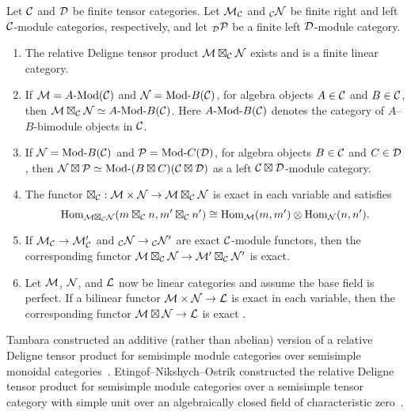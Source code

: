 \documentclass{amsart}
\begin{document}
\begin{theorem} \label{thm:DelignePrdtOverATCExists}
	Let $\mathcal C$ and $\mathcal D$ be finite tensor categories.  Let $\mathcal M_{\mathcal C}$ and ${}_{\mathcal C}\mathcal N$ be finite right and left $\mathcal C$-module categories, respectively, and let ${}_{\mathcal D}\mathcal P$ be a finite left $\mathcal D$-module category. 
	\begin{enumerate}
		\item The relative Deligne tensor product $\mathcal M \boxtimes_{\mathcal C} \mathcal N$ exists and is a finite linear category.
		\item If $\cM = \Mod{A}{}(\cC)$ and $\cN = \Mod{}{B}(\cC)$, for algebra objects $A \in \mathcal C$ and $B \in \mathcal C$, then $\cM \boxtimes_{\cC} \cN \simeq \Mod{A }{B}(\cC)$. Here $\Mod{A}{B}(\cC)$ denotes the category of $A$--$B$-bimodule objects in $\mathcal C$.
		\item If $\cN = \Mod{}{B}(\cC)$ and $\cP = \Mod{}{C}(\cD)$, for algebra objects $B \in \mathcal C$ and $C \in \mathcal D$, then $\cN \boxtimes \cP \simeq \Mod{}{(B \boxtimes C)}(\cC \boxtimes \cD)$ as a left $\mathcal C \boxtimes \mathcal D$-module category.
		\item The functor $\boxtimes_{\mathcal C}: \mathcal M \times \mathcal N \rightarrow \mathcal M \boxtimes_\mathcal C \mathcal N$ is exact in each variable and satisfies 
		\begin{equation*}
			\operatorname{Hom}_{\mathcal M \boxtimes_{\mathcal C} \mathcal N} (m \boxtimes_\mathcal C n, m' \boxtimes_\mathcal C n') \cong \operatorname{Hom}_{\mathcal M}(m,m') \otimes \operatorname{Hom}_{\mathcal N}(n, n').
		\end{equation*}
		\item If $\mathcal M_\mathcal C \rightarrow \mathcal M'_\mathcal C$ and ${}_\mathcal C \mathcal N \rightarrow {}_\mathcal C \mathcal N'$ are exact $\mathcal C$-module functors, then the corresponding functor $\mathcal M \boxtimes_\mathcal C \mathcal N \rightarrow \mathcal M' \boxtimes_\mathcal C \mathcal N'$ is exact.
		\item Let $\mathcal M$, $\mathcal N$, and $\mathcal L$ now be linear categories and assume the base field is perfect.  If a bilinear functor $\mathcal M \times \mathcal N \rightarrow \mathcal L$ is exact in each variable, then the corresponding functor $\mathcal M \boxtimes \mathcal N \rightarrow \mathcal L$ is exact \cite[Prop 5.13(vi)]{deligne}.
	\end{enumerate} 
\end{theorem}
\nid Tambara constructed an additive (rather than abelian) version of a relative Deligne tensor product for semisimple module categories over semisimple monoidal categories~\cite{tambara}.  Etingof--Nikshych--Ostrik constructed the relative Deligne tensor product for semisimple module categories over a semisimple tensor category with simple unit over an algebraically closed field of characteristic zero~\cite{0909.3140}.  
\end{document}
